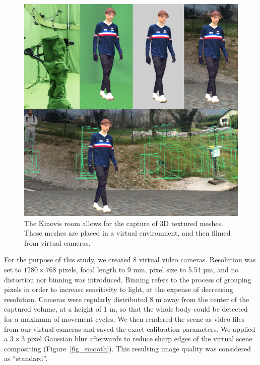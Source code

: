 \begin{figure}[!ht]
	\centering
	\def\svgwidth{1\columnwidth}
	\fontsize{10pt}{10pt}\selectfont
	\includegraphics[width=\linewidth]{"../Chap4/Figures/Fig_Kinovis.png"}
	\caption{The Kinovis room allows for the capture of 3D textured meshes. These meshes are placed in a virtual environment, and then filmed from virtual cameras.}
	\label{fig_kinovis}
\end{figure}

For the purpose of this study, we created 8 virtual video cameras. Resolution was set to \(1280 \times 768\) pixels, focal length to 9 mm, pixel size to 5.54 µm, and no distortion nor binning was introduced. Binning refers to the process of grouping pixels in order to increase sensitivity to light, at the expense of decreasing resolution. Cameras were regularly distributed 8 m away from the center of the captured volume, at a height of 1 m, so that the whole body could be detected for a maximum of movement cycles. We then rendered the scene as video files from our virtual cameras and saved the exact calibration parameters. We applied a \(3 \times 3\) pixel Gaussian blur afterwards to reduce sharp edges of the virtual scene compositing (Figure~\ref{fig_smooth}). This resulting image quality was considered as “standard”.


